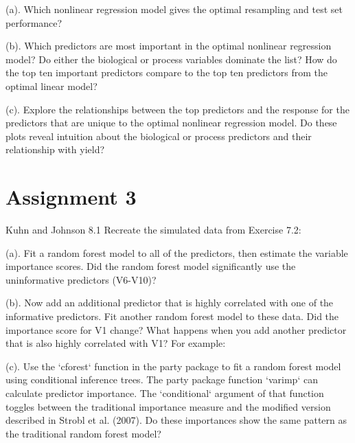 \documentclass[]{report}
\begin{document}
\begin{subquestion}{(a).}
Which nonlinear regression model gives the optimal resampling and test set performance? 
\end{subquestion}

\begin{subquestion}{(b).}
Which predictors are most important in the optimal nonlinear regression model? Do either the biological or process variables dominate the list? How do the top ten important predictors compare to the top ten predictors from the optimal linear model? 
\end{subquestion}

\begin{subquestion}{(c).}
Explore the relationships between the top predictors and the response for the predictors that are unique to the optimal nonlinear regression model. Do these plots reveal intuition about the biological or process predictors and their relationship with yield?
\end{subquestion}

\hypertarget{AS-3}{%
\chapter*{Assignment 3}\label{AS-3}}


\begin{question}{Kuhn and Johnson 8.1} Recreate the simulated data from Exercise 7.2: \end{question}

\begin{subquestion}{(a).} Fit a random forest model to all of the predictors, then estimate the variable importance scores. Did the random forest model significantly use the uninformative predictors (V6-V10)?\end{subquestion}

\begin{subquestion}{(b).} Now add an additional predictor that is highly correlated with one of the informative predictors. Fit another random forest model to these data. Did the importance score for V1 change? What happens when you add another predictor that is also highly correlated with V1? For example:\end{subquestion}

\begin{subquestion}{(c).} Use the `cforest` function in the party package to fit a random forest model using conditional inference trees. The party package function `varimp` can calculate predictor importance. The `conditional` argument of that function toggles between the traditional importance measure and the modified version described in Strobl et al. (2007). Do these importances show the same pattern as the traditional random forest model?\end{subquestion}
\end{document}
